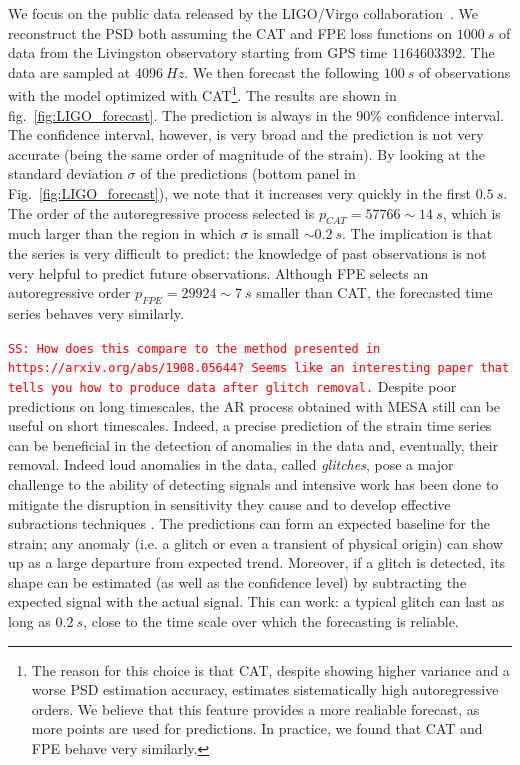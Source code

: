 \documentclass[twocolumn,showpacs,preprintnumbers,nofootinbib,prd,
superscriptaddress,10pt]{revtex4-1}
\newcommand{\sschmidt}[1]{{\textcolor{red}{\texttt{SS: #1}} }}
\begin{document}
We focus on the public data released by the LIGO/Virgo collaboration~\cite{Abbott_2021}.
We reconstruct the PSD both assuming the CAT and FPE loss functions on $\SI{1000}{s}$ of data from the Livingston observatory
starting from GPS time $1164603392$. The data are sampled at $\SI{4096}{Hz}$.
We then forecast the following $\SI{100}{s}$ of observations with the model optimized with CAT\footnote{
The reason for this choice is that CAT, despite showing higher variance and a worse PSD estimation accuracy, estimates sistematically high autoregressive orders. We believe that this feature provides a more realiable forecast, as more points are used for predictions. In practice, we found that CAT and FPE behave very similarly.
}. The results are shown in fig.~\ref{fig:LIGO_forecast}.
The prediction is always in the $90\%$ confidence interval. The confidence interval, however, is very broad and the prediction is not very accurate (being the same order of magnitude of the strain).
By looking at the standard deviation $\sigma$ of the predictions (bottom panel in Fig.~\ref{fig:LIGO_forecast}), we note that it increases very quickly in the first $\SI{0.5}{s}$.
The order of the autoregressive process selected is $p_{CAT} = 57766 \sim \SI{14}{s}$, which is much larger than the region in which $\sigma$ is small $\sim \SI{0.2}{s}$. The implication is that the series is very difficult to predict: the knowledge of past observations is not very helpful to predict future observations. Although FPE selects an autoregressive order $p_{FPE} = 29924 \sim \SI{7}{s}$ smaller than CAT,  the forecasted time series behaves very similarly.

\sschmidt{How does this compare to the method presented in https://arxiv.org/abs/1908.05644? Seems like an interesting paper that tells you how to produce data after glitch removal.}
Despite poor predictions on long timescales, the AR process obtained with MESA still can be useful on short timescales. Indeed, a precise prediction of the strain time series can be beneficial in the detection of anomalies in the data and, eventually, their removal. Indeed loud anomalies in the data, called {\it glitches}, pose a major challenge to the ability of detecting signals and intensive work has been done to mitigate the disruption in sensitivity they cause \cite{Nuttall_2015, Noise_char_2016, Zevin_2017} and to develop effective subractions techniques \cite{Pankow_2018}.
The predictions can form an expected baseline for the strain; any anomaly (i.e. a glitch or even a transient of physical origin) can show up as a large departure from expected trend.
Moreover, if a glitch is detected, its shape can be estimated (as well as the confidence level) by subtracting the expected signal with the actual signal.
This can work: a typical glitch can last as long as $\SI{0.2}{s}$, close to the time scale over which the forecasting is reliable.
\end{document}
